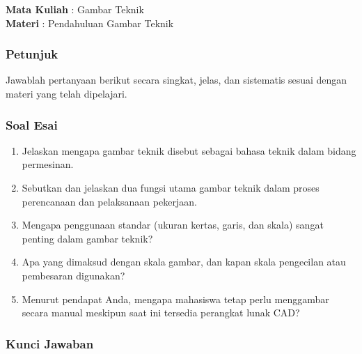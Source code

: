 \documentclass[../menggambarteknik.tex]{subfiles}
\begin{document}
\textbf{Mata Kuliah} : Gambar Teknik\\
\textbf{Materi} : Pendahuluan Gambar Teknik

\subsubsection*{Petunjuk}
Jawablah pertanyaan berikut secara singkat, jelas, dan sistematis sesuai dengan materi yang telah dipelajari.

\subsubsection*{Soal Esai}

\begin{enumerate}
	\item Jelaskan mengapa gambar teknik disebut sebagai bahasa teknik dalam bidang permesinan.
	\item Sebutkan dan jelaskan dua fungsi utama gambar teknik dalam proses perencanaan dan pelaksanaan pekerjaan.
	\item Mengapa penggunaan standar (ukuran kertas, garis, dan skala) sangat penting dalam gambar teknik?
	\item Apa yang dimaksud dengan skala gambar, dan kapan skala pengecilan atau pembesaran digunakan?
	\item Menurut pendapat Anda, mengapa mahasiswa tetap perlu menggambar secara manual meskipun saat ini tersedia perangkat lunak CAD?
\end{enumerate}

\subsubsection*{Kunci Jawaban}
\end{document}
